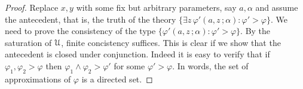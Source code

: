 \documentclass[11pt,oneside]{amsart}
\begin{document}
\begin{proof}
Replace $x,y$ with some fix but arbitrary parameters, say $a,\alpha$ and assume the antecedent, that is, the truth of the theory $\{\exists z\,\varphi'(a,z\,;\alpha):\varphi'>\varphi\}$.
We need to prove the consistency of the type $\{\varphi'(a,z\,;\alpha):\varphi'>\varphi\}$.
By the saturation of ${\EuScript U}$, finite concistency suffices.
This is clear if we show that the antecedent is closed under conjunction.
Indeed it is easy to verify that if $\varphi_1,\varphi_2>\varphi$ then $\varphi_1\wedge\varphi_2>\varphi'$ for some $\varphi'>\varphi$.
In words, the set of approximations of $\varphi$ is a directed set.
%
%
%
%
%
\end{proof}


\def\ceq#1#2#3{\parbox[t]{20ex}{$\displaystyle #1$}\parbox{5ex}{\hfil $#2$}{$\displaystyle #3$}}

  






\end{document}
